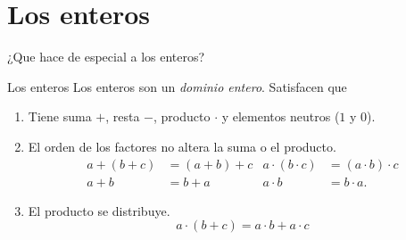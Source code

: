 \section{Los enteros}

\begin{frame}{}
\end{frame}


\begin{frame}
  \begin{center}\fontsize{20}{24}\selectfont
    ¿Que hace de especial a los enteros?
  \end{center}
\end{frame}




\begin{frame}{Los enteros}
  Los enteros son un \emph{dominio entero}. Satisfacen que
  \begin{enumerate}[<+->]
    \item Tiene suma $+$, resta $-$, producto $\cdot$ y elementos neutros ($1$ y $0$).
    \item El orden de los factores no altera la suma o el producto.
    \begin{align*}
      a + (b + c) &= (a + b) + c    &    a \cdot (b \cdot c) &= (a \cdot b) \cdot c \\
      a + b &= b + a    &    a \cdot b &= b \cdot a.
    \end{align*}
    \item El producto se distribuye.
    \[
      a \cdot ( b + c) = a\cdot b + a\cdot c
    \]
  \end{enumerate}
\end{frame}



